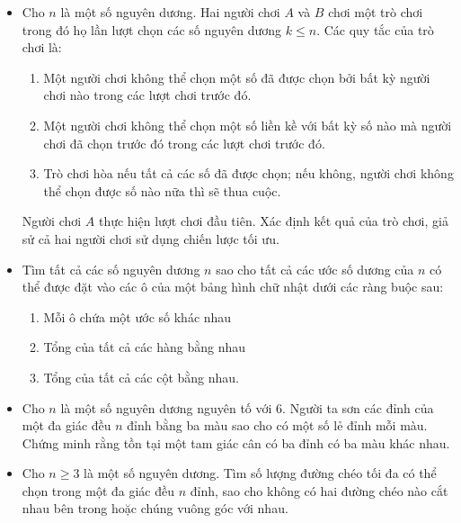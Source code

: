 \documentclass[11pt]{scrartcl}
\begin{document}
\begin{itemize}[label=, leftmargin=0em, itemsep=0.5em]
    \item \begin{btvn}
        Cho $n$ là một số nguyên dương. Hai người chơi $A$ và $B$ chơi một trò chơi trong đó họ lần lượt chọn các số nguyên dương $k \leq n$. Các quy tắc của trò chơi là:
        \begin{enumerate}
            \item Một người chơi không thể chọn một số đã được chọn bởi bất kỳ người chơi nào trong các lượt chơi trước đó.
            \item Một người chơi không thể chọn một số liền kề với bất kỳ số nào mà người chơi đã chọn trước đó trong các lượt chơi trước đó.
            \item Trò chơi hòa nếu tất cả các số đã được chọn; nếu không, người chơi không thể chọn được số nào nữa thì sẽ thua cuộc.
        \end{enumerate}
        Người chơi $A$ thực hiện lượt chơi đầu tiên. Xác định kết quả của trò chơi, giả sử cả hai người chơi sử dụng chiến lược tối ưu.
    \end{btvn}

    
    \item \begin{btvn}    
        Tìm tất cả các số nguyên dương $n$ sao cho tất cả các ước số dương của $n$ có thể được đặt vào các ô của một bảng hình chữ nhật dưới các ràng buộc sau:
        \begin{enumerate}
            \item Mỗi ô chứa một ước số khác nhau
            \item Tổng của tất cả các hàng bằng nhau
            \item Tổng của tất cả các cột bằng nhau.
        \end{enumerate}
            \end{btvn}
    \item\begin{btvn}
        Cho $n$ là một số nguyên dương nguyên tố với $6$. Người ta sơn các đỉnh của một đa giác đều $n$ đỉnh bằng ba màu sao cho có một số lẻ đỉnh mỗi màu. Chứng minh rằng tồn tại một tam giác cân có ba đỉnh có ba màu khác nhau.
    \end{btvn}


    \item \begin{btvn}
        Cho $n \geq 3$ là một số nguyên dương. Tìm số lượng đường chéo tối đa có thể chọn trong một đa giác đều $n$ đỉnh, sao cho không có hai đường chéo nào cắt nhau bên trong hoặc chúng vuông góc với nhau.
    \end{btvn}



\end{itemize}
\end{document}
